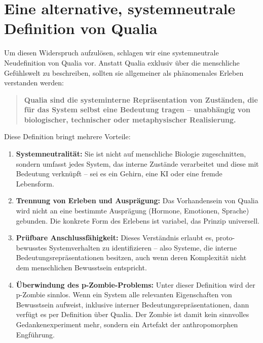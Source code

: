 \section*{Eine alternative, systemneutrale Definition von Qualia}

Um diesen Widerspruch aufzulösen, schlagen wir eine systemneutrale Neudefinition von Qualia vor. Anstatt Qualia exklusiv über die menschliche Gefühlswelt zu beschreiben, sollten sie allgemeiner als phänomenales Erleben verstanden werden:

\begin{quote}
\textbf{Qualia sind die systeminterne Repräsentation von Zuständen, die für das System selbst eine Bedeutung tragen – unabhängig von biologischer, technischer oder metaphysischer Realisierung.}
\end{quote}

Diese Definition bringt mehrere Vorteile:

\begin{enumerate}
    \item \textbf{Systemneutralität:} Sie ist nicht auf menschliche Biologie zugeschnitten, sondern umfasst jedes System, das interne Zustände verarbeitet und diese mit Bedeutung verknüpft – sei es ein Gehirn, eine KI oder eine fremde Lebensform.
    
    \item \textbf{Trennung von Erleben und Ausprägung:} Das Vorhandensein von Qualia wird nicht an eine bestimmte Ausprägung (Hormone, Emotionen, Sprache) gebunden. Die konkrete Form des Erlebens ist variabel, das Prinzip universell.
    
    \item \textbf{Prüfbare Anschlussfähigkeit:} Dieses Verständnis erlaubt es, proto-bewusstes Systemverhalten zu identifizieren – also Systeme, die interne Bedeutungsrepräsentationen besitzen, auch wenn deren Komplexität nicht dem menschlichen Bewusstsein entspricht.
    
    \item \textbf{Überwindung des p-Zombie-Problems:} Unter dieser Definition wird der p-Zombie sinnlos. Wenn ein System alle relevanten Eigenschaften von Bewusstsein aufweist, inklusive interner Bedeutungsrepräsentationen, dann verfügt es per Definition über Qualia. Der Zombie ist damit kein sinnvolles Gedankenexperiment mehr, sondern ein Artefakt der anthropomorphen Engführung.
\end{enumerate}

